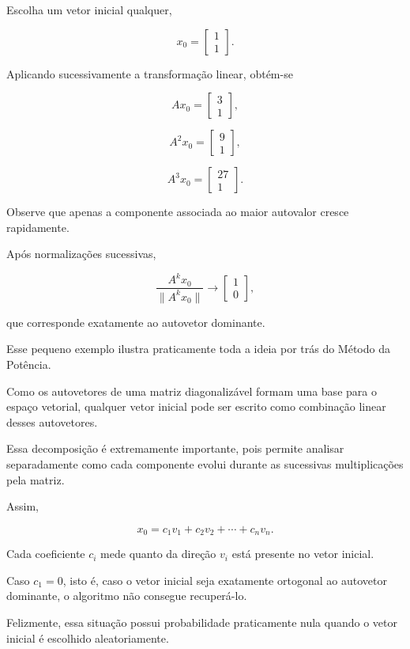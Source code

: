 \documentclass[12pt, a4paper]{article}
\begin{document}
Escolha um vetor inicial qualquer,

\[
x_0=
\begin{bmatrix}
1\\
1
\end{bmatrix}.
\]

Aplicando sucessivamente a transformação linear, obtém-se

\[
Ax_0=
\begin{bmatrix}
3\\
1
\end{bmatrix},
\]

\[
A^2x_0=
\begin{bmatrix}
9\\
1
\end{bmatrix},
\]

\[
A^3x_0=
\begin{bmatrix}
27\\
1
\end{bmatrix}.
\]

Observe que apenas a componente associada ao maior autovalor cresce rapidamente.

Após normalizações sucessivas,

\[
\frac{A^kx_0}{\|A^kx_0\|}
\longrightarrow
\begin{bmatrix}
1\\
0
\end{bmatrix},
\]

que corresponde exatamente ao autovetor dominante.

Esse pequeno exemplo ilustra praticamente toda a ideia por trás do Método da Potência.

Como os autovetores de uma matriz diagonalizável formam uma base para o espaço vetorial, qualquer vetor inicial pode ser escrito como combinação linear desses autovetores.

Essa decomposição é extremamente importante, pois permite analisar separadamente como cada componente evolui durante as sucessivas multiplicações pela matriz.

Assim,

\[
x_0
=
c_1v_1+c_2v_2+\cdots+c_nv_n.
\]

Cada coeficiente \(c_i\) mede quanto da direção \(v_i\) está presente no vetor inicial.

Caso \(c_1=0\), isto é, caso o vetor inicial seja exatamente ortogonal ao autovetor dominante, o algoritmo não consegue recuperá-lo.

Felizmente, essa situação possui probabilidade praticamente nula quando o vetor inicial é escolhido aleatoriamente.
\end{document}
